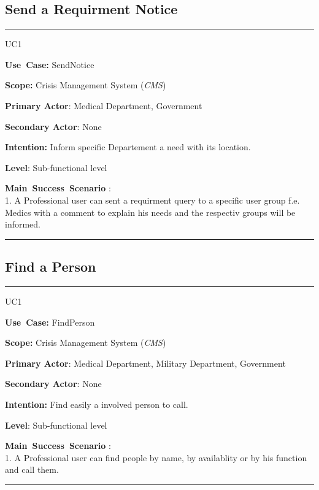 \subsection{Send a Requirment Notice}
\vspace{0.5cm}
\hrule
\vspace{0.5cm}
\begin{lyxlist}{UC1}
\small{
\item [\textbf{Use~Case:}] SendNotice
\item [\textbf{Scope:}] Crisis Management System (\emph{CMS})
\item [\textbf{Primary Actor}:] Medical Department, Government
\item [\textbf{Secondary Actor}:] None
\item [\textbf{Intention:}] Inform specific Departement a need with its
location.
\item [\textbf{Level}:]Sub-functional level
\item [\textbf{Main~Success~Scenario}]:\\
1. A Professional user can sent a requirment query to a specific user group
f.e. Medics with a comment to explain his needs and the respectiv groups will
be informed. \\
}
\end{lyxlist}
\hrule 
\vspace{0.5cm} 


\subsection{Find a Person}
\vspace{0.5cm}
\hrule
\vspace{0.5cm}
\begin{lyxlist}{UC1}
\small{
\item [\textbf{Use~Case:}] FindPerson
\item [\textbf{Scope:}] Crisis Management System (\emph{CMS})
\item [\textbf{Primary Actor}:] Medical Department, Military Department,
Government
\item [\textbf{Secondary Actor}:] None
\item [\textbf{Intention:}] Find easily a involved person to call.
\item [\textbf{Level}:]Sub-functional level
\item [\textbf{Main~Success~Scenario}]:\\
1. A Professional user can find people by name, by availablity or by his
function and call them.\\
}
\end{lyxlist}
\hrule 
\vspace{0.5cm} 

